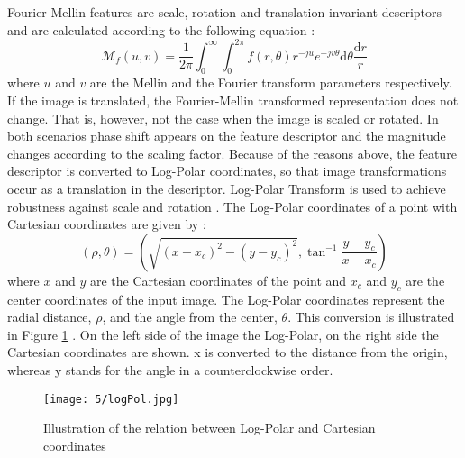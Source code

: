 \documentclass[draft,final]{vutinfth} %
\begin{document}
\par
Fourier-Mellin features are scale, rotation and translation invariant descriptors and are calculated according to the following equation \cite{kazik2011visual}:
\begin{equation}
\mathcal{M}_f(u,v) = \frac{1}{2\pi} \int_{0}^{\infty}\int_{0}^{2\pi} f(r, \theta)r^{-ju}e^{-jv\theta}\mathrm{d}\theta\frac{\mathrm{d}r}{r}
\end{equation}
where $u$ and $v$ are the Mellin and the Fourier transform parameters respectively.
If the image is translated, the Fourier-Mellin transformed representation does not change.
That is, however, not the case when the image is scaled or rotated.
In both scenarios phase shift appears on the feature descriptor and the magnitude changes according to the scaling factor.
Because of the reasons above, the feature descriptor is converted to Log-Polar coordinates, so that image transformations occur as a translation in the descriptor.
Log-Polar Transform is used to achieve robustness against scale and rotation  \cite{gueham2008automatic}.
The Log-Polar coordinates of a point with Cartesian coordinates are given by \cite{sarvaiya2012image}:
\begin{equation}
(\rho,\theta) = (\sqrt{(x-x_c)^2 - (y-y_c)^2}, \tan^{-1}\frac{y-y_c}{x-x_c})
\end{equation}
where $x$ and $y$ are the Cartesian coordinates of the point and $x_c$ and $y_c$ are the center coordinates of the input image.
The Log-Polar coordinates represent the radial distance, $\rho$, and the angle from the center, $\theta$.
This conversion is illustrated in Figure \ref{fig:sans:logPol} \cite{sarvaiya2012image}.
On the left side of the image the Log-Polar, on the right side the Cartesian coordinates are shown.
x is converted to the distance from the origin, whereas y stands for the angle in a counterclockwise order. 
\begin{figure}[h]
  \centering
  \texttt{[image: 5/logPol.jpg]}
  \caption{Illustration of the relation between Log-Polar and Cartesian coordinates \cite{sarvaiya2012image}}
  \label{fig:sans:logPol} %
\end{figure}
\end{document}
